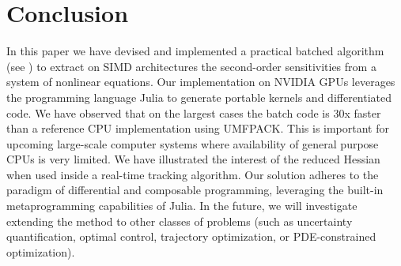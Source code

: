 \section{Conclusion}
In this paper we have devised and implemented a practical batched algorithm (see )
to extract on SIMD architectures the second-order sensitivities from a system
of nonlinear equations. Our implementation on NVIDIA
GPUs leverages the programming language Julia to generate portable kernels
and differentiated code. We have observed that on the largest cases the batch
code is 30x faster than a reference CPU implementation using
UMFPACK. This is important for upcoming large-scale computer systems where availability of general purpose CPUs is very limited.
We have illustrated the interest of the reduced Hessian when used inside
a real-time tracking algorithm.
%
Our solution adheres to the paradigm of differential and composable
programming, leveraging the built-in metaprogramming capabilities of Julia.
In the future, we will investigate extending the method
to other classes of problems (such as uncertainty
quantification, optimal control, trajectory optimization, or PDE-constrained optimization).


